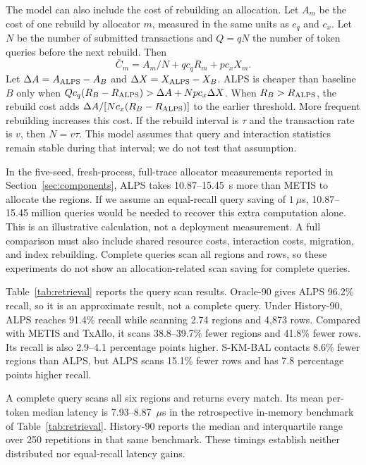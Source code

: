 \documentclass[conference,letterpaper]{IEEEtran}
\begin{document}
The model can also include the cost of rebuilding an allocation. Let $A_m$
be the cost of one rebuild by allocator $m$, measured in the same units as
$c_q$ and $c_x$. Let $N$ be the number of submitted transactions and
$Q=qN$ the number of token queries before the next rebuild. Then
\begin{equation}
\label{eq:amortised_cost}
\bar C_m=A_m/N+q c_q R_m+p c_x X_m.
\end{equation}
Let $\Delta A=A_{\rm ALPS}-A_B$ and
$\Delta X=X_{\rm ALPS}-X_B$. ALPS is cheaper than baseline $B$ only when
$Q c_q(R_B-R_{\rm ALPS})>\Delta A+Np c_x\Delta X$.
When $R_B>R_{\rm ALPS}$, the rebuild cost adds
$\Delta A/[N c_x(R_B-R_{\rm ALPS})]$ to the earlier threshold. More frequent
rebuilding increases this cost. If the rebuild interval is $\tau$ and the
transaction rate is $v$, then $N=v\tau$. This model assumes that query and
interaction statistics remain stable during that interval; we do not test
that assumption.

In the five-seed, fresh-process, full-trace allocator measurements reported in
Section~\ref{sec:components}, ALPS takes 10.87--15.45~s more than METIS to
allocate the regions. If we assume an equal-recall query saving of
$1~\mu$s, 10.87--15.45 million queries would be needed to recover this extra
computation alone. This is an illustrative calculation, not a deployment
measurement. A full comparison must also include shared resource costs,
interaction costs, migration, and index rebuilding. Complete queries scan all
regions and rows, so these experiments do not show an allocation-related scan
saving for complete queries.

Table~\ref{tab:retrieval} reports the query scan results. Oracle-90 gives
ALPS 96.2\% recall, so it is an approximate result, not a complete query.
Under History-90, ALPS reaches 91.4\% recall while scanning 2.74 regions and
4,873 rows. Compared with METIS and TxAllo, it scans 38.8--39.7\% fewer
regions and 41.8\% fewer rows. Its recall is also 2.9--4.1 percentage points
higher. S-KM-BAL contacts 8.6\% fewer regions than ALPS, but ALPS scans
15.1\% fewer rows and has 7.8 percentage points higher recall.

A complete query scans all six regions and returns every match. Its mean
per-token median latency is 7.93--8.87~$\mu$s in the retrospective in-memory
benchmark of Table~\ref{tab:retrieval}. History-90 reports the median and
interquartile range over 250 repetitions in that same benchmark. These timings
establish neither distributed nor equal-recall latency gains.
\end{document}
